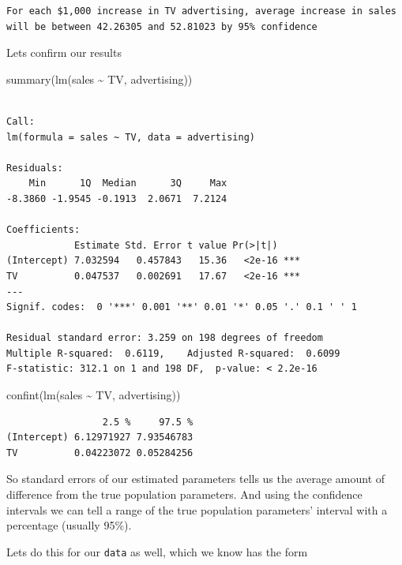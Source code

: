 \documentclass[
  letterpaper,
  DIV=11,
  numbers=noendperiod]{scrreprt}
\newenvironment{Shaded}{\begin{snugshade}}{\end{snugshade}}
\newcommand{\FunctionTok}[1]{\textcolor[rgb]{0.28,0.35,0.67}{#1}}
\newcommand{\NormalTok}[1]{\textcolor[rgb]{0.00,0.23,0.31}{#1}}
\newcommand{\SpecialCharTok}[1]{\textcolor[rgb]{0.37,0.37,0.37}{#1}}
\begin{document}
\begin{verbatim}
For each $1,000 increase in TV advertising, average increase in sales will be between 42.26305 and 52.81023 by 95% confidence
\end{verbatim}

Lets confirm our results

\begin{Shaded}
\begin{Highlighting}[]
\FunctionTok{summary}\NormalTok{(}\FunctionTok{lm}\NormalTok{(sales }\SpecialCharTok{\textasciitilde{}}\NormalTok{ TV, advertising))}
\end{Highlighting}
\end{Shaded}

\begin{verbatim}

Call:
lm(formula = sales ~ TV, data = advertising)

Residuals:
    Min      1Q  Median      3Q     Max 
-8.3860 -1.9545 -0.1913  2.0671  7.2124 

Coefficients:
            Estimate Std. Error t value Pr(>|t|)    
(Intercept) 7.032594   0.457843   15.36   <2e-16 ***
TV          0.047537   0.002691   17.67   <2e-16 ***
---
Signif. codes:  0 '***' 0.001 '**' 0.01 '*' 0.05 '.' 0.1 ' ' 1

Residual standard error: 3.259 on 198 degrees of freedom
Multiple R-squared:  0.6119,    Adjusted R-squared:  0.6099 
F-statistic: 312.1 on 1 and 198 DF,  p-value: < 2.2e-16
\end{verbatim}

\begin{Shaded}
\begin{Highlighting}[]
\FunctionTok{confint}\NormalTok{(}\FunctionTok{lm}\NormalTok{(sales }\SpecialCharTok{\textasciitilde{}}\NormalTok{ TV, advertising))}
\end{Highlighting}
\end{Shaded}

\begin{verbatim}
                 2.5 %     97.5 %
(Intercept) 6.12971927 7.93546783
TV          0.04223072 0.05284256
\end{verbatim}

So standard errors of our estimated parameters tells us the average
amount of difference from the true population parameters. And using the
confidence intervals we can tell a range of the true population
parameters' interval with a percentage (usually 95\%).

Lets do this for our \texttt{data} as well, which we know has the form
\end{document}
